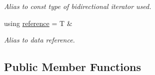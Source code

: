 \begin{DoxyCompactItemize}
\begin{DoxyCompactList}\small\item\em Alias to const type of bidirectional iterator used. \end{DoxyCompactList}\item 
\mbox{\label{classls_1_1list_afb0f652e0362bc8c3e82c16efe795bf3}} 
using \hyperlink{classls_1_1list_afb0f652e0362bc8c3e82c16efe795bf3}{reference} = T \&
\begin{DoxyCompactList}\small\item\em Alias to data reference. \end{DoxyCompactList}\end{DoxyCompactItemize}
\subsection*{Public Member Functions}
